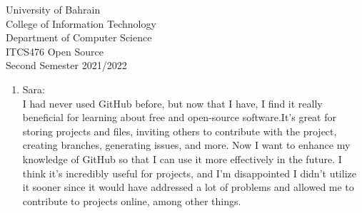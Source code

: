 \documentclass[12pt]{article}
\begin{document}
   \begin{enumerate}
   {\Large University of Bahrain}\\
   College of Information Technology\\
   Department of Computer Science\\
   ITCS476 Open Source\\
   Second Semester 2021/2022\\[0.2cm]
 

\bigskip
   \renewcommand{\arraystretch}{1.4}   %
   
   \end{enumerate}

\begin{enumerate}
  \item Sara:\\
   I had never used GitHub before, but now that I have, I find it really beneficial for learning about free and open-source software.It's great for storing projects and files, inviting others to contribute with the project, creating branches, generating issues, and more. Now I want to enhance my knowledge of GitHub so that I can use it more effectively in the future. I think it's incredibly useful for projects, and I'm disappointed I didn't utilize it sooner since it would have addressed a lot of problems and allowed me to contribute to projects online, among other things.\\
      
\end{enumerate}
\end{document}
